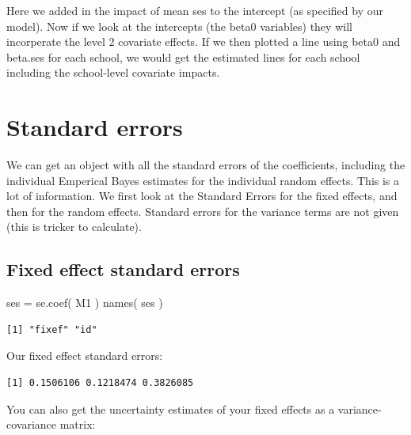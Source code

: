 \documentclass[
  letterpaper,
  DIV=11,
  numbers=noendperiod]{scrreprt}
\newenvironment{Shaded}{\begin{snugshade}}{\end{snugshade}}
\newcommand{\FunctionTok}[1]{\textcolor[rgb]{0.02,0.16,0.49}{#1}}
\newcommand{\NormalTok}[1]{\textcolor[rgb]{0.00,0.44,0.13}{#1}}
\newcommand{\OtherTok}[1]{\textcolor[rgb]{0.00,0.44,0.13}{#1}}
\newcommand{\SpecialCharTok}[1]{\textcolor[rgb]{0.25,0.44,0.63}{#1}}
\begin{document}
Here we added in the impact of mean ses to the intercept (as specified
by our model). Now if we look at the intercepts (the beta0 variables)
they will incorperate the level 2 covariate effects. If we then plotted
a line using beta0 and beta.ses for each school, we would get the
estimated lines for each school including the school-level covariate
impacts.

\hypertarget{standard-errors}{%
\section{Standard errors}\label{standard-errors}}

We can get an object with all the standard errors of the coefficients,
including the individual Emperical Bayes estimates for the individual
random effects. This is a lot of information. We first look at the
Standard Errors for the fixed effects, and then for the random effects.
Standard errors for the variance terms are not given (this is tricker to
calculate).

\hypertarget{fixed-effect-standard-errors}{%
\subsection{Fixed effect standard
errors}\label{fixed-effect-standard-errors}}

\begin{Shaded}
\begin{Highlighting}[]
\NormalTok{ses }\OtherTok{=} \FunctionTok{se.coef}\NormalTok{( M1 )}
\FunctionTok{names}\NormalTok{( ses )}
\end{Highlighting}
\end{Shaded}

\begin{verbatim}
[1] "fixef" "id"   
\end{verbatim}

Our fixed effect standard errors:

\begin{Shaded}
\end{Shaded}

\begin{verbatim}
[1] 0.1506106 0.1218474 0.3826085
\end{verbatim}

You can also get the uncertainty estimates of your fixed effects as a
variance-covariance matrix:
\end{document}
